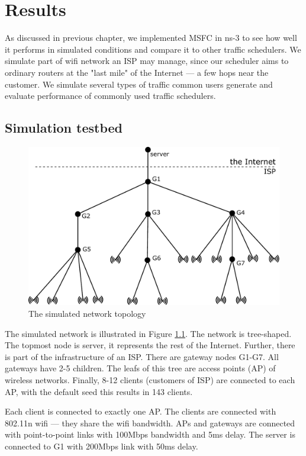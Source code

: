 \chapter{Results}
\label{chap:sidh}
As discussed in previous chapter, we implemented MSFC in ns-3 to see how well it performs in simulated conditions and compare it to other traffic schedulers. We simulate part of wifi network an ISP may manage, since our scheduler aims to ordinary routers at the "last mile" of the Internet --- a few hops near the customer. We simulate several types of traffic common users generate and evaluate performance of commonly used traffic schedulers. 

\section{Simulation testbed}

\begin{figure}
	\centering
	\includegraphics[width=137mm]{drawings/layout}
	\caption{The simulated network topology}
	\label{fig11:sim_layout}
\end{figure}


The simulated network is illustrated in Figure \ref{fig11:sim_layout}. The network is tree-shaped. The topmost node is server, it represents the rest of the Internet. Further, there is part of the infrastructure of an ISP. There are gateway nodes G1-G7. All gateways have 2-5 children. The leafs of this tree are access points (AP) of wireless networks. Finally, 8-12 clients (customers of ISP) are connected to each AP, with the default seed this results in 143 clients. 

Each client is connected to exactly one AP. The clients are connected with 802.11n wifi --- they share the wifi bandwidth. APs and gateways are connected with point-to-point links with 100Mbps bandwidth and 5ms delay. The server is connected to G1 with 200Mbps link with 50ms delay.

